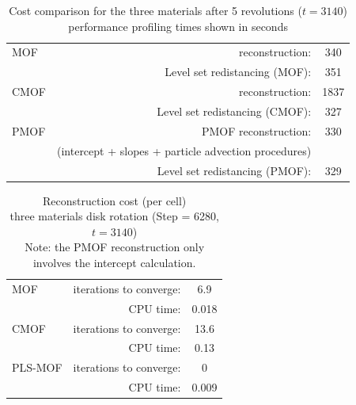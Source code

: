 \documentclass[preprint,12pt]{Definitions/elsarticle}
\begin{document}
\begin{table}[H]
	\centering	
	\caption{Cost comparison for the three materials after 5 revolutions ($t=3140$)\\
		performance profiling times shown in seconds}
	\renewcommand{\arraystretch}{1.1} %
	\begin{tabular}{|l|r|c|}
		\hline
		MOF& reconstruction: &340\\
		&Level set redistancing (MOF): &351
		\\ \hline 
		CMOF& reconstruction: &1837\\
		&Level set redistancing (CMOF): &327
		\\ \hline
		PMOF&PMOF reconstruction: &330\\
		&(intercept + slopes + particle advection procedures) & \\
		&Level set redistancing (PMOF): &329
		\\ \hline
	\end{tabular}  
	\label{diskcost}	
\end{table}

\begin{table}[H]
	\centering	
	\caption{Reconstruction cost (per cell)\\
		three materials disk rotation (Step = 6280, $t=3140$)\\
		Note: the PMOF reconstruction only involves the intercept calculation.
	}
	\renewcommand{\arraystretch}{1.1} %
	\begin{tabular}{|l|r|c|}
		\hline
		MOF& iterations to converge: &6.9\\
		&CPU time: &0.018
		\\ \hline 
		CMOF& iterations to converge: &13.6\\
		& CPU time: &0.13
		\\ \hline
		PLS-MOF& iterations to converge: &0\\
		& CPU time: &0.009
		\\ \hline
	\end{tabular}  
	\label{diskcost2}	
\end{table}


\FloatBarrier
\end{document}
